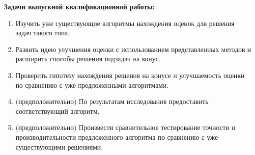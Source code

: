 \textbf{Задачи выпускной квалификационной работы:}
\begin{enumerate}
  \item Изучить уже существующие алгоритмы нахождения оценок для решения задач такого типа.
  \item Развить идею улучшения оценки с использованием представленных методов и расширить способы решения подзадач на конус.
  \item Проверить гипотезу нахождения решения на конусе и улучшаемость оценки по сравнению с уже предложенными алгоритмами.
  \item (предположительно) По результатам исследования предоставить соответствующий алгоритм.
  \item (предположительно) Произвести сравнительное тестирование точности и производительности предложенного алгоритма по сравнению с уже существующими решениями.
\end{enumerate}

